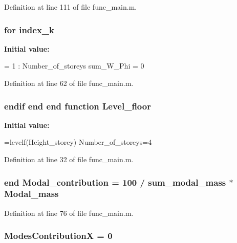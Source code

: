 Definition at line 111 of file func\-\_\-main.\-m.

\subsubsection[{index\-\_\-k}]{\setlength{\rightskip}{0pt plus 5cm}for index\-\_\-k}\label{func__main_8m_aeb7138595dee788b60a4aab95ea30ead}
{\bfseries Initial value\-:}
\begin{DoxyCode}
= 1 : Number\_of\_storeys
                sum\_W\_Phi = 0
\end{DoxyCode}


Definition at line 62 of file func\-\_\-main.\-m.

\subsubsection[{Level\-\_\-floor}]{\setlength{\rightskip}{0pt plus 5cm}endif end end {\bf function} Level\-\_\-floor}\label{func__main_8m_afbcb7c65e7756ba8ad0c8011e8b9ec84}
{\bfseries Initial value\-:}
\begin{DoxyCode}
=levelf(Height\_storey)
        Number\_of\_storeys=4
\end{DoxyCode}


Definition at line 32 of file func\-\_\-main.\-m.

\subsubsection[{Modal\-\_\-contribution}]{\setlength{\rightskip}{0pt plus 5cm}end Modal\-\_\-contribution = 100 / {\bf sum\-\_\-modal\-\_\-mass} $\ast$ {\bf Modal\-\_\-mass}}\label{func__main_8m_afc15fafadb4f9b24ca3f82f6b72bafcf}


Definition at line 76 of file func\-\_\-main.\-m.

\subsubsection[{Modes\-Contribution\-X}]{\setlength{\rightskip}{0pt plus 5cm}Modes\-Contribution\-X = 0}\label{func__main_8m_a55f0e7d483cc95c31ab81c9bdcbed944}


